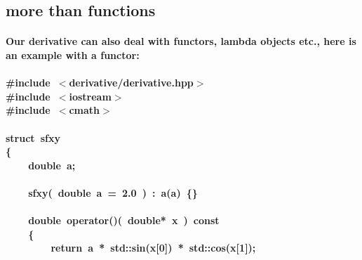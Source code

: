 \documentclass[9pt,onside,a4paper]{article}
\newcommand{\hlstd}[1]{\textcolor[rgb]{0.2,0,0.4}{#1}}
\newcommand{\hlnum}[1]{\textcolor[rgb]{0.2,0.73,0.02}{#1}}
\newcommand{\hlppc}[1]{\textcolor[rgb]{0.33,0.45,0.69}{#1}}
\newcommand{\hlopt}[1]{\textcolor[rgb]{0.33,0.33,0.33}{#1}}
\newcommand{\hlkwa}[1]{\textcolor[rgb]{1,0.19,0.19}{#1}}
\newcommand{\hlkwb}[1]{\textcolor[rgb]{0.96,0.55,0.14}{#1}}
\newcommand{\hlkwc}[1]{\textcolor[rgb]{0,0,1}{#1}}
\newcommand{\hlkwd}[1]{\textcolor[rgb]{0.82,0.11,0.93}{#1}}
\begin{document}
\subsection{more than functions}
\paragraph{Our derivative can also deal with functors, lambda objects etc., here is an example with a functor:\\}
\noindent 
\ttfamily 
\paragraph{\hlppc{\#include\ $<$derivative/derivative.hpp$>$}\hspace*{\fill}\\
\hlppc{\#include\ $<$iostream$>$}\hspace*{\fill}\\
\hlstd{}\hlppc{\#include\ $<$cmath$>$}\hspace*{\fill}\\
\hlstd{}\hspace*{\fill}\\
\hlkwb{struct\ }\hlstd{sfxy}\hspace*{\fill}\\
\hlopt{\{}\hspace*{\fill}\\
\hlstd{}\hlstd{\ \ \ \ }\hlstd{}\hlkwb{double\ }\hlstd{a}\hlopt{;}\hspace*{\fill}\\
\hlstd{\hspace*{\fill}\\
}\hlstd{\ \ \ \ }\hlstd{}\hlkwd{sfxy}\hlstd{}\hlopt{(\ }\hlstd{}\hlkwb{double\ }\hlstd{a\textunderscore \ }\hlopt{=\ }\hlstd{}\hlnum{2.0\ }\hlstd{}\hlopt{)\ :\ }\hlstd{}\hlkwd{a}\hlstd{}\hlopt{(}\hlstd{a\textunderscore }\hlopt{)\ \{\}}\hspace*{\fill}\\
\hlstd{\hspace*{\fill}\\
}\hlstd{\ \ \ \ }\hlstd{}\hlkwb{double\ }\hlstd{}\hlkwc{operator}\hlstd{}\hlopt{()(\ }\hlstd{}\hlkwb{double}\hlstd{}\hlopt{{*}\ }\hlstd{x\ }\hlopt{)\ }\hlstd{}\hlkwb{const}\hspace*{\fill}\\
\hlstd{}\hlstd{\ \ \ \ }\hlstd{}\hlopt{\{}\hspace*{\fill}\\
\hlstd{}\hlstd{\ \ \ \ \ \ \ \ }\hlstd{}\hlkwa{return\ }\hlstd{a\ }\hlopt{{*}\ }\hlstd{std}\hlopt{::}\hlstd{}\hlkwd{sin}\hlstd{}\hlopt{(}\hlstd{x}\hlopt{{[}}\hlstd{}\hlnum{0}\hlstd{}\hlopt{{]})\ {*}\ }\hlstd{std}\hlopt{::}\hlstd{}\hlkwd{cos}\hlstd{}\hlopt{(}\hlstd{x}\hlopt{{[}}\hlstd{}\hlnum{1}\hlstd{}\hlopt{{]});}\hspace*{\fill}\\
}
\end{document}
